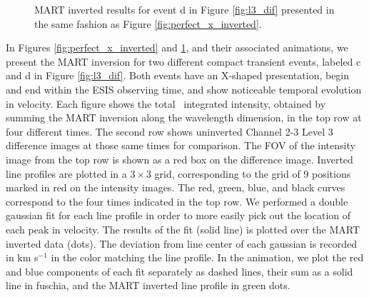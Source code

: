         \begin{figure}[htb!]
    	\centering
    	\caption{MART inverted results for event d in Figure \ref{fig:l3_dif} presented in the same fashion as Figure \ref{fig:perfect_x_inverted}.}
    	\label{fig:other_x_inverted}
    	\end{figure}
    	
    	In Figures \ref{fig:perfect_x_inverted} and \ref{fig:other_x_inverted}, and their associated animations, we present the MART inversion for two different compact transient events, labeled c and d in Figure \ref{fig:l3_dif}.
    	Both events have an X-shaped presentation, begin and end within the ESIS observing time, and show noticeable temporal evolution in velocity.
		Each figure shows the total \ov \ integrated intensity, %
		obtained by summing the MART inversion
		along the wavelength dimension, 
		in the top row  at four different times. 
		The second row shows uninverted Channel 2-3 Level 3 difference images at those same times for comparison.
		The FOV of the intensity image from the top row is shown as a red box on the difference image. %
		Inverted \ov line profiles are plotted in a $3\times 3$ grid, corresponding to the grid of 9 positions marked
		in red on the intensity images. The red, green, blue, and black curves correspond to the four times indicated in
		the top row.
		We performed a double gaussian fit for each line profile in order to more easily pick out the location of each peak in velocity.
		The results of the fit (solid line) is plotted over the MART inverted data (dots).
		The deviation from line center of each gaussian is recorded in km s$^{-1}$ in the color matching the line profile.
		In the animation, we plot the red and blue components of each fit separately as dashed lines, their sum as a solid line in fuschia, and the MART inverted line profile in  green dots.
		

